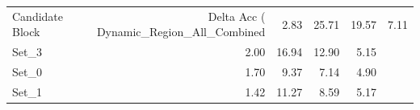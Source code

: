 \begin{tabular}{lrrrr}
\toprule
Candidate Block & Delta Acc (%
\midrule
Dynamic_Region_All_Combined & 2.83 & 25.71 & 19.57 & 7.11 \\
Set_3 & 2.00 & 16.94 & 12.90 & 5.15 \\
Set_0 & 1.70 & 9.37 & 7.14 & 4.90 \\
Set_1 & 1.42 & 11.27 & 8.59 & 5.17 \\
\bottomrule
\end{tabular}

